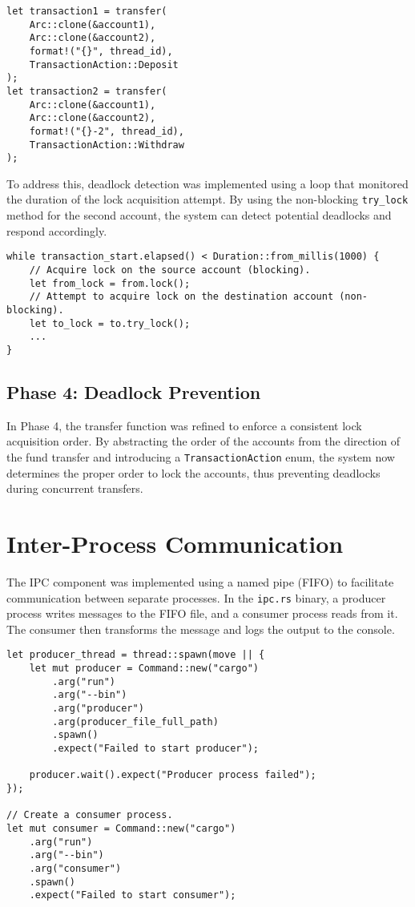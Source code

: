 \documentclass[conference]{report}
\begin{document}
\hfill
\begin{lstlisting}[caption={Deadlock Creation Example}, label=code:phase3-deadlock]
let transaction1 = transfer(
    Arc::clone(&account1),
    Arc::clone(&account2),
    format!("{}", thread_id),
    TransactionAction::Deposit
);
let transaction2 = transfer(
    Arc::clone(&account1),
    Arc::clone(&account2),
    format!("{}-2", thread_id),
    TransactionAction::Withdraw
);
\end{lstlisting}

To address this, deadlock detection was implemented using a loop that monitored the duration of the lock acquisition attempt. By using the non-blocking \texttt{try\_lock} method for the second account, the system can detect potential deadlocks and respond accordingly.

\hfill
\begin{lstlisting}[caption={Deadlock Detection Example}, label=code:phase3-detection]
while transaction_start.elapsed() < Duration::from_millis(1000) {
    // Acquire lock on the source account (blocking).
    let from_lock = from.lock();
    // Attempt to acquire lock on the destination account (non-blocking).
    let to_lock = to.try_lock();
    ...
}
\end{lstlisting}

\subsection*{Phase 4: Deadlock Prevention}
In Phase 4, the transfer function was refined to enforce a consistent lock acquisition order. By abstracting the order of the accounts from the direction of the fund transfer and introducing a \texttt{TransactionAction} enum, the system now determines the proper order to lock the accounts, thus preventing deadlocks during concurrent transfers.

\section*{Inter-Process Communication}
The IPC component was implemented using a named pipe (FIFO) to facilitate communication between separate processes. In the \texttt{ipc.rs} binary, a producer process writes messages to the FIFO file, and a consumer process reads from it. The consumer then transforms the message and logs the output to the console.

\hfill
\begin{lstlisting}[caption={Creating Multiple Processes}, label=code:ipc-start]
let producer_thread = thread::spawn(move || {
    let mut producer = Command::new("cargo")
        .arg("run")
        .arg("--bin")
        .arg("producer")
        .arg(producer_file_full_path)
        .spawn()
        .expect("Failed to start producer");

    producer.wait().expect("Producer process failed");
});

// Create a consumer process.
let mut consumer = Command::new("cargo")
    .arg("run")
    .arg("--bin")
    .arg("consumer")
    .spawn()
    .expect("Failed to start consumer");
\end{lstlisting}
\end{document}
